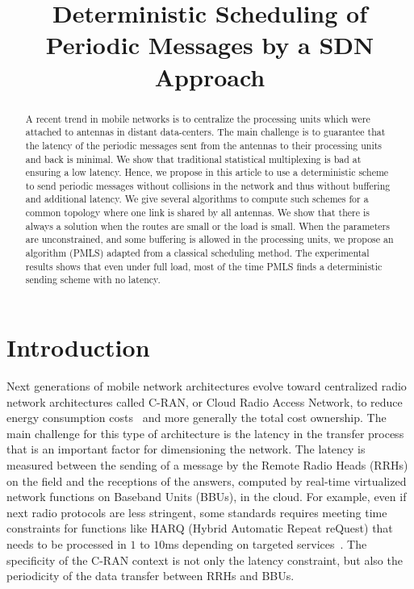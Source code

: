 \documentclass[10pt, conference, letterpaper]{IEEEtran}
\title{Deterministic Scheduling of Periodic Messages by a SDN Approach}
\author{}
\begin{document}
\maketitle

\begin{abstract}
A recent trend in mobile networks is to centralize the processing units which were attached to 
antennas in distant data-centers. The main challenge is to guarantee that the latency of the periodic messages 
sent from the antennas to their processing units and back is minimal. We show that traditional statistical multiplexing
is bad at ensuring a low latency. Hence, we propose in this article to use a deterministic scheme to send periodic messages without collisions in the network and thus without buffering and additional latency. 
We give several algorithms to compute such schemes for a common topology where one link is shared by all antennas.
We show that there is always a solution when the routes are small or the load is small. When the parameters are unconstrained,
and some buffering is allowed in the processing units, we propose an algorithm (PMLS) adapted from a classical scheduling method.
The experimental results shows that even under full load, most of the time PMLS finds a deterministic sending scheme with no latency.
\end{abstract}


\section{Introduction}

Next generations of mobile network architectures evolve toward centralized radio network architectures called C-RAN, or Cloud Radio Access Network, to reduce energy consumption costs~\cite{mobile2011c} and more generally the total cost ownership. The main challenge for this type of architecture is the latency in the transfer process that is an important factor for dimensioning the network. The latency is measured between the sending of a message by the Remote Radio Heads (RRHs) on the field and the receptions of the answers, computed by real-time virtualized network functions on Baseband Units (BBUs), in the cloud. For example, even if next radio protocols are less stringent, some standards requires meeting time constraints for functions like HARQ (Hybrid Automatic Repeat reQuest) that needs to be processed in $1$ to $10$ms depending on targeted services~\cite{bouguen2012lte}. The specificity of the C-RAN context is not only the latency constraint, but also the periodicity of the data transfer between RRHs and BBUs.
\end{document}
